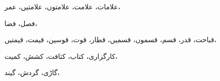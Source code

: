                                                                                                                                                                                     علامات،            علامت،            علامتوں،            علامتیں،            عمر،
                                                                                                                                                                                    
                                                                                                                                                                                                فصل،            فضا،
                                                                                                                                                                                                
                                                                                                                                                                                                            قباحت،            قدر،            قسم،            قسموں،            قسمیں،            قطار،            قوت،            قوسین،            قیمت،            قیمتیں،
                                                                                                                                                                                                            
                                                                                                                                                                                                                        کارگزاری،            کتاب،            کثافت،            کشش،            کمیت،            
                                                                                                                                                                                                                        
                                                                                                                                                                                                                        گاڑی،            گردش،            گیند،
                                                                                                                                                                                                                        
